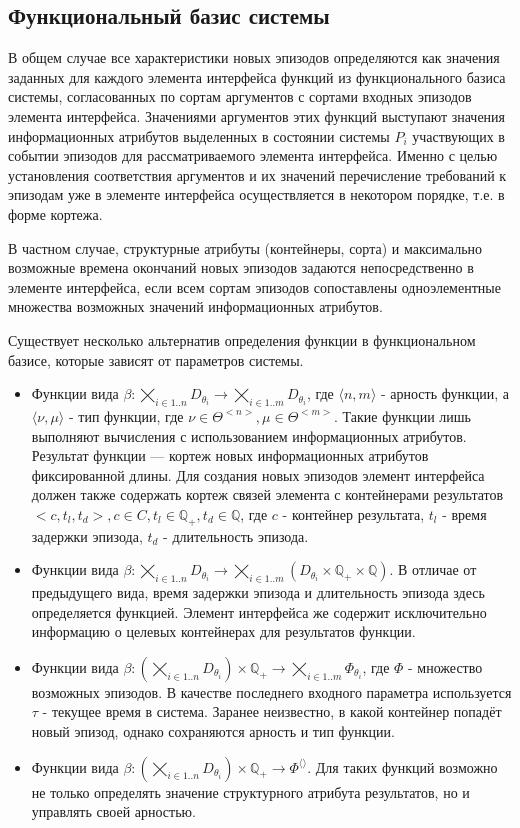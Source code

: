 \subsection{Функциональный базис системы}
В общем случае все характеристики новых эпизодов определяются как значения заданных для каждого элемента интерфейса функций из функционального базиса системы, согласованных по сортам аргументов с сортами входных эпизодов элемента интерфейса. 
Значениями аргументов этих функций выступают значения информационных атрибутов выделенных в состоянии системы $ P_i $ участвующих в событии эпизодов для рассматриваемого элемента интерфейса. 
Именно с целью установления соответствия аргументов и их значений перечисление требований к эпизодам уже в элементе интерфейса осуществляется в некотором порядке, т.е. в форме кортежа. 

В частном случае, структурные атрибуты (контейнеры, сорта) и максимально возможные времена окончаний новых эпизодов задаются непосредственно в элементе интерфейса, если всем сортам эпизодов сопоставлены одноэлементные множества возможных значений информационных атрибутов. 

Существует несколько альтернатив определения функции в функциональном базисе, которые зависят от параметров системы.
\begin{itemize}
	\item Функции вида $ \beta : \bigtimes_{i \in 1..n} D_{\theta_i} \rightarrow \bigtimes_{i \in 1..m} D_{\theta_i}$, где $ \langle
	n,m \rangle $ - арность функции, а $ \langle \nu, \mu \rangle $ - тип функции, где $ \nu \in \Theta^{<n>}, \mu \in \Theta^{<m>} $. 
	Такие функции лишь выполняют вычисления с использованием информационных атрибутов. 
	Результат функции --- кортеж новых информационных атрибутов фиксированной длины. 
	Для создания новых эпизодов элемент интерфейса должен также содержать кортеж связей элемента с контейнерами результатов $ <c, t_l, t_d >, c \in C, t_l \in \mathbb{\mathbb{Q}}_+, t_d \in \mathbb{\mathbb{Q}} $, где $ c $ - контейнер результата, $ t_l $ - время задержки эпизода, $ t_d $ - длительность эпизода.
	\item Функции вида $ \beta : \bigtimes_{i \in 1..n} D_{\theta_i} \rightarrow \bigtimes_{i \in 1..m} (D_{\theta_i} \times \mathbb{Q}_+ \times \mathbb{Q})$. 
	В отличае от предыдущего вида, время задержки эпизода и длительность эпизода здесь определяется функцией.
	Элемент интерфейса же содержит исключительно информацию о целевых контейнерах для результатов функции.
	\item Функции вида $ \beta : (\bigtimes_{i \in 1..n} D_{\theta_i}) \times \mathbb{Q}_+ \rightarrow \bigtimes_{i \in 1..m} \Phi_{\theta_i}$, где $ \Phi $ - множество возможных эпизодов.
	В качестве последнего входного параметра используется $ \tau $ - текущее время в система.
	Заранее неизвестно, в какой контейнер попадёт новый эпизод, однако сохраняются арность и тип функции.
	\item Функции вида $ \beta : (\bigtimes_{i \in 1..n} D_{\theta_i}) \times \mathbb{Q}_+ \rightarrow \Phi^{\langle\rangle}$.
	Для таких функций возможно не только определять значение структурного атрибута результатов, но и управлять своей арностью.
\end{itemize}

